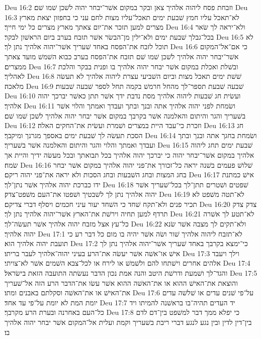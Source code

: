 Deu 16:2  וזבחת פסח ליהוה אלהיך צאן ובקר במקום אשׁר־יבחר יהוה לשׁכן שׁמו שׁם׃
Deu 16:3  לא־תאכל עליו חמץ שׁבעת ימים תאכל־עליו מצות לחם עני כי בחפזון יצאת מארץ מצרים למען תזכר את־יום צאתך מארץ מצרים כל ימי חייך׃
Deu 16:4  ולא־יראה לך שׂאר בכל־גבלך שׁבעת ימים ולא־ילין מן־הבשׂר אשׁר תזבח בערב ביום הראשׁון לבקר׃
Deu 16:5  לא תוכל לזבח את־הפסח באחד שׁעריך אשׁר־יהוה אלהיך נתן לך׃
Deu 16:6  כי אם־אל־המקום אשׁר־יבחר יהוה אלהיך לשׁכן שׁמו שׁם תזבח את־הפסח בערב כבוא השׁמשׁ מועד צאתך ממצרים׃
Deu 16:7  ובשׁלת ואכלת במקום אשׁר יבחר יהוה אלהיך בו ופנית בבקר והלכת לאהליך׃
Deu 16:8  שׁשׁת ימים תאכל מצות וביום השׁביעי עצרת ליהוה אלהיך לא תעשׂה מלאכה׃
Deu 16:9  שׁבעה שׁבעת תספר־לך מהחל חרמשׁ בקמה תחל לספר שׁבעה שׁבעות׃
Deu 16:10  ועשׂית חג שׁבעות ליהוה אלהיך מסת נדבת ידך אשׁר תתן כאשׁר יברכך יהוה אלהיך׃
Deu 16:11  ושׂמחת לפני יהוה אלהיך אתה ובנך ובתך ועבדך ואמתך והלוי אשׁר בשׁעריך והגר והיתום והאלמנה אשׁר בקרבך במקום אשׁר יבחר יהוה אלהיך לשׁכן שׁמו שׁם׃
Deu 16:12  וזכרת כי־עבד היית במצרים ושׁמרת ועשׂית את־החקים האלה׃
Deu 16:13  חג הסכת תעשׂה לך שׁבעת ימים באספך מגרנך ומיקבך׃
Deu 16:14  ושׂמחת בחגך אתה ובנך ובתך ועבדך ואמתך והלוי והגר והיתום והאלמנה אשׁר בשׁעריך׃
Deu 16:15  שׁבעת ימים תחג ליהוה אלהיך במקום אשׁר־יבחר יהוה כי יברכך יהוה אלהיך בכל תבואתך ובכל מעשׂה ידיך והיית אך שׂמח׃
Deu 16:16  שׁלושׁ פעמים בשׁנה יראה כל־זכורך את־פני יהוה אלהיך במקום אשׁר יבחר בחג המצות ובחג השׁבעות ובחג הסכות ולא יראה את־פני יהוה ריקם׃
Deu 16:17  אישׁ כמתנת ידו כברכת יהוה אלהיך אשׁר נתן־לך׃
Deu 16:18  שׁפטים ושׁטרים תתן־לך בכל־שׁעריך אשׁר יהוה אלהיך נתן לך לשׁבטיך ושׁפטו את־העם משׁפט־צדק׃
Deu 16:19  לא־תטה משׁפט לא תכיר פנים ולא־תקח שׁחד כי השׁחד יעור עיני חכמים ויסלף דברי צדיקם׃
Deu 16:20  צדק צדק תרדף למען תחיה וירשׁת את־הארץ אשׁר־יהוה אלהיך נתן לך׃
Deu 16:21  לא־תטע לך אשׁרה כל־עץ אצל מזבח יהוה אלהיך אשׁר תעשׂה־לך׃
Deu 16:22  ולא־תקים לך מצבה אשׁר שׂנא יהוה אלהיך׃
Deu 17:1  לא־תזבח ליהוה אלהיך שׁור ושׂה אשׁר יהיה בו מום כל דבר רע כי תועבת יהוה אלהיך הוא׃
Deu 17:2  כי־ימצא בקרבך באחד שׁעריך אשׁר־יהוה אלהיך נתן לך אישׁ או־אשׁה אשׁר יעשׂה את־הרע בעיני יהוה־אלהיך לעבר בריתו׃
Deu 17:3  וילך ויעבד אלהים אחרים וישׁתחו להם ולשׁמשׁ או לירח או לכל־צבא השׁמים אשׁר לא־צויתי׃
Deu 17:4  והגד־לך ושׁמעת ודרשׁת היטב והנה אמת נכון הדבר נעשׂתה התועבה הזאת בישׂראל׃
Deu 17:5  והוצאת את־האישׁ ההוא או את־האשׁה ההוא אשׁר עשׂו את־הדבר הרע הזה אל־שׁעריך את־האישׁ או את־האשׁה וסקלתם באבנים ומתו׃
Deu 17:6  על־פי שׁנים עדים או שׁלשׁה עדים יומת המת לא יומת על־פי עד אחד׃
Deu 17:7  יד העדים תהיה־בו בראשׁנה להמיתו ויד כל־העם באחרנה ובערת הרע מקרבך׃
Deu 17:8  כי יפלא ממך דבר למשׁפט בין־דם לדם בין־דין לדין ובין נגע לנגע דברי ריבת בשׁעריך וקמת ועלית אל־המקום אשׁר יבחר יהוה אלהיך בו׃
